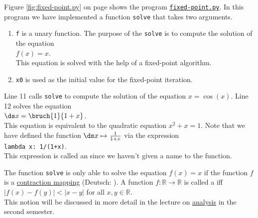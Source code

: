 Figure \ref{fig:fixed-point.py} on page \pageref{fig:fixed-point.py} shows the program
\href{https://github.com/karlstroetmann/Logic/blob/master/Python/fixed-point.py}{\texttt{fixed-point.py}}.
In this program we have implemented a function \texttt{solve} that takes two arguments.
\begin{enumerate}
\item \texttt{f} is a unary function.  The purpose of the \texttt{solve} is to compute the solution of the equation
      \\[0.2cm]
      \hspace*{1.3cm}
      $f(x) = x$.
      \\[0.2cm]
      This equation is solved with the help of a fixed-point algorithm.
\item \texttt{x0} is used as the initial value for the fixed-point iteration.
\end{enumerate}
Line 11 calls \texttt{solve} to compute the solution of the equation $x = \cos(x)$.
Line 12 solves the equation 
\\[0.2cm]
\hspace*{1.3cm}
$\ds x = \bruch{1}{1+x}$. 
\\[0.2cm]
This equation is equivalent to the quadratic equation $x^2 + x = 1$.  Note that we have defined the function
 $\ds x \mapsto \frac{1}{1+x}$ via the expression
 \\[0.2cm]
\hspace*{1.3cm}
\texttt{lambda x: 1/(1+x)}.
\\[0.2cm]
This expression is called an  
since we haven't given a name to the function.  

\remarkEng
The function \texttt{solve} is only able to solve the equation $f(x) = x$ if the function $f$ is a 
\href{https://en.wikipedia.org/wiki/Contraction_mapping}{contraction mapping} (Deutsch: ). 
  A function 
$f:\mathbb{R} \rightarrow \mathbb{R}$
is called a  iff 
\\[0.2cm]
\hspace*{1.3cm}
$|f(x) - f(y)| < |x - y|$ \quad for all $x,y \in \mathbb{R}$.
\\[0.2cm]
This notion will be discussed in more detail in the lecture on 
\href{https://github.com/karlstroetmann/Analysis/blob/master/Skript/analysis.pdf}{analysis} in the second
semester. \eox  


